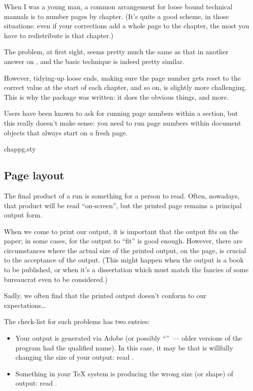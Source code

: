 
When I was a young man, a common arrangement for loose bound technical
manuals is to number pages by chapter.  (It's quite a good scheme, in
those situations: even if your corrections add a whole page to the
chapter, the most you have to redistribute is that chapter.)

The problem, at first sight, seems pretty much the same as that in
another answer on
,
and the basic technique is indeed pretty similar.

However, tidying-up loose ends, making sure the page number gets reset
to the correct value at the start of each chapter, and so on, is
slightly more challenging.  This is why the  package
was written: it does the obvious things, and more.

Users have been known to ask for running page numbers within a
section, but this really doesn't make sense: you need to run page
numbers within document objects that always start on a fresh page.
\begin{ctanrefs}
\item[chappg.sty]
\end{ctanrefs}

\subsection{Page layout}


The final product of a \AllTeX{} run is something for a person to
read.  Often, nowadays, that product will be read ``on-screen'', but
the printed page remains a principal output form.

When we come to print our output, it is important that the output fits
on the paper; in some cases, for the output to ``fit'' is good enough.
However, there are circumstances where the actual size of the printed
output, on the page, is crucial to the acceptance of the output.
(This might happen when the output is a book to be published, or when
it's a dissertation which must match the fancies of some bureaucrat
even to be considered.)

Sadly, we often find that the printed output doesn't conform to our
expectations\dots{}

The check-list for such problems has two entries:
\begin{itemize}
\item Your output is generated via Adobe  (or
  possibly ``''~--- older versions of the
  program had the qualified name).  In this case, it may be that
   is willfully changing the size of your output:
  read .
\item Something in your \TeX{} system is producing the wrong size (or
  shape) of output: read .
\end{itemize}

